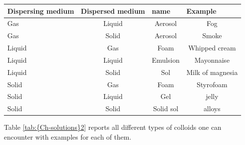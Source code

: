 \documentclass[main.tex]{subfiles}
\newcommand\chapterlabel{Ch-solutions}\setcounter{figurenewcounter}{0}\setcounter{tablenewcounter}{0}\setcounter{formulanewcounter}{0}
\begin{document}
\begin{description}
\begin{center}
\begin{tabular}{llll}
\midrule
 \rowcolor{gray!10} Dispersing medium & Dispersed medium& name & Example\\
\midrule
Gas	& \multicolumn{1}{c}{Liquid}&\multicolumn{1}{c}{Aerosol} &\multicolumn{1}{c}{Fog} \\ 
 Gas	& \multicolumn{1}{c}{Solid}&\multicolumn{1}{c}{Aerosol} &\multicolumn{1}{c}{Smoke} \\ 
Liquid	& \multicolumn{1}{c}{Gas}&\multicolumn{1}{c}{Foam} &\multicolumn{1}{c}{Whipped cream} \\ 
Liquid	& \multicolumn{1}{c}{Liquid}&\multicolumn{1}{c}{Emulsion} &\multicolumn{1}{c}{Mayonnaise} \\ 
Liquid	& \multicolumn{1}{c}{Solid}&\multicolumn{1}{c}{Sol} &\multicolumn{1}{c}{Milk of magnesia} \\ 
Solid	& \multicolumn{1}{c}{Gas}&\multicolumn{1}{c}{Foam} &\multicolumn{1}{c}{Styrofoam} \\ 
Solid	& \multicolumn{1}{c}{Liquid}&\multicolumn{1}{c}{Gel} &\multicolumn{1}{c}{jelly} \\ 
Solid	& \multicolumn{1}{c}{Solid}&\multicolumn{1}{c}{Solid sol} &\multicolumn{1}{c}{alloys} \\ 

 \bottomrule
\end{tabular}\end{center} 
Table \ref{tab:{\chapterlabel}2} reports all different types of colloids one can encounter with examples for each of them.
\end{description}
\end{document}

